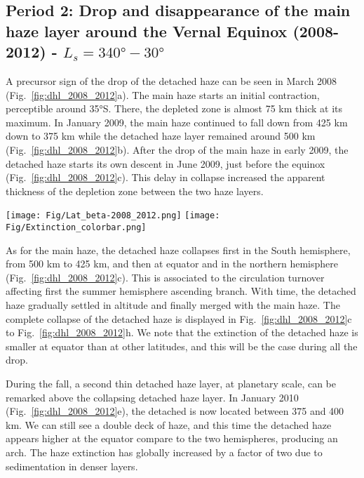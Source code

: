 \subsection{Period 2: Drop and disappearance of the main haze layer around the Vernal Equinox (2008-2012) - $L_s=\ang{340}-\ang{30}$}

A precursor sign of the drop of the detached haze can be seen in March 2008 (Fig.~\ref{fig:dhl_2008_2012}a).
The main haze starts an initial contraction, perceptible around \ang{35}S. There, the depleted zone is almost
75 km thick at its maximum. In January 2009, the main haze continued to fall down from 425 km down to 375 km
while the detached haze layer remained around 500 km (Fig.~\ref{fig:dhl_2008_2012}b). After the drop
of the main haze in early 2009, the detached haze starts its own descent in June 2009, just before the equinox
(Fig.~\ref{fig:dhl_2008_2012}c). This delay in collapse increased the apparent thickness of the depletion
zone between the two haze layers.

\begin{figure*}[!ht]
    \centering
    \texttt{[image: Fig/Lat\_beta-2008\_2012.png]}
    \texttt{[image: Fig/Extinction\_colorbar.png]}\vspace{-.3cm}
    \caption{Same as the figure~\ref{fig:dhl_2008_2012} for 8 images taken between 2008 and 2012
    ($L_s=\ang{340}-\ang{30}$) showing the collapse of drop and disappearance of the DHL.
    The color schema extent is kept similar to the figure~\ref{fig:dhl_2008_2012} to provide
    direct comparisons but the altitude range is extended down to 300 km around the UV3 saturation
    level (where the atmosphere is opaque).}
    \label{fig:dhl_2008_2012}
\end{figure*}

As for the main haze, the detached haze collapses first in the South hemisphere, from 500 km to 425 km, and
then at equator and in the northern hemisphere (Fig.~\ref{fig:dhl_2008_2012}c).
This is associated to the circulation turnover affecting first the summer hemisphere ascending branch.
With time, the detached haze gradually settled in altitude and finally merged with
the main haze. The complete collapse of the detached haze is displayed in Fig.~\ref{fig:dhl_2008_2012}c to
Fig.~\ref{fig:dhl_2008_2012}h. We note that the extinction of the detached haze is smaller at equator than at
other latitudes, and this will be the case during all the drop.

During the fall, a second thin detached haze layer, at planetary scale, can be remarked above the collapsing detached
haze layer. In January 2010 (Fig.~\ref{fig:dhl_2008_2012}e), the detached is now located between 375 and 400 km.
We can still see a double deck of haze, and this time the detached haze appears higher at the equator compare to the two
hemispheres, producing an arch. The haze extinction has globally increased by a factor of two due to sedimentation
in denser layers.

